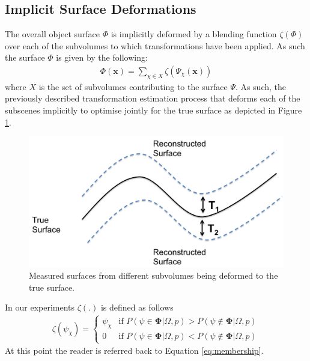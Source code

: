 \subsection{Implicit Surface Deformations}
The overall object surface $\Phi$ is implicitly deformed by a blending function $\zeta(\Phi)$ over each of the subvolumes to which transformations have been applied.
As such the surface $\Phi$ is given by the following:
\begin{equation}
\begin{split}
\Phi(\mathbf{x}) = \sum_{\chi \in X} \zeta(\Psi_{\chi}(\mathbf{x}))
\end{split}
\end{equation}
where $X$ is the set of subvolumes contributing to the surface $\Psi$. As such, the previously described transformation estimation process that deforms each of the subscenes implicitly to optimise jointly 
for the true surface as depicted in Figure \ref{fig:deformationDiagram}.
\begin{figure}[!t]
	\centering
	\includegraphics[scale=0.25]{deformation.png}
	\vspace{-3mm}
	\caption{Measured surfaces from different subvolumes being deformed to the true surface.}
	\label{fig:deformationDiagram}
\end{figure}
In our experiments $\zeta (.)$ is defined as follows
\begin{equation}
\begin{split}
\zeta(\psi_{\chi}) = 
\begin{cases}
\psi_{\chi} & \text{if $P(\psi \in \mathbf{\Phi} | \Omega, p) > P(\psi \notin \mathbf{\Phi} | \Omega, p)$} \\
0 & \text{if $P(\psi \in \mathbf{\Phi} | \Omega, p) < P(\psi \notin \mathbf{\Phi} | \Omega, p)$}
\end{cases}
\end{split}
\end{equation}
At this point the reader is referred back to Equation \ref{eq:membership}.

